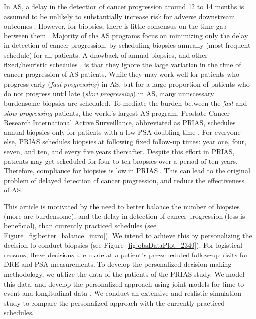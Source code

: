 In AS, a delay in the detection of cancer progression around 12 to 14 months is assumed to be unlikely to substantially increase risk for adverse downstream outcomes \cite{inoue2018comparative,carvalho}. However, for biopsies, there is little consensus on the time gap between them \cite{loeb2014heterogeneity}. Majority of the AS programs focus on minimizing only the delay in detection of cancer progression, by scheduling biopsies annually (most frequent schedule) for all patients. A drawback of annual biopsies, and other fixed/heuristic schedules \cite{inoue2018comparative,nieboer2018active}, is that they ignore the large variation in the time of cancer progression of AS patients. While they may work well for patients who progress early (\textit{fast progressing}) in AS, but for a large proportion of patients who do not progress until late (\textit{slow progressing}) in AS, many unnecessary burdensome biopsies are scheduled. To mediate the burden between the \textit{fast} and \textit{slow progressing} patients, the world's largest AS program, Prostate Cancer Research International Active Surveillance\cite{bokhorst2016decade}, abbreviated as PRIAS, schedules annual biopsies only for patients with a low PSA doubling time \cite{bokhorst2015compliance}. For everyone else, PRIAS schedules biopsies at following fixed follow-up times: year one, four, seven, and ten, and every five years thereafter. Despite this effort in PRIAS, patients may get scheduled for four to ten biopsies over a period of ten years. Therefore, compliance for biopsies is low in PRIAS \cite{bokhorst2015compliance}. This can lead to the original problem of delayed detection of cancer progression, and reduce the effectiveness of AS.


This article is motivated by the need to better balance the number of biopsies (more are burdensome), and the delay in detection of cancer progression (less is beneficial), than currently practiced schedules (see Figure~\ref{fig:better_balance_intro}). We intend to achieve this by personalizing the decision to conduct biopsies (see Figure~\ref{fig:obsDataPlot_2340}). For logistical reasons, these decisions are made at a patient's pre-scheduled follow-up visits for DRE and PSA measurements. To develop the personalized decision making methodology, we utilize the data of the patients of the PRIAS study. We model this data, and develop the personalized approach using joint models for time-to-event and longitudinal data \cite{tsiatis2004joint,rizopoulos2012joint}. We conduct an extensive and realistic simulation study to compare the personalized approach with the currently practiced schedules.

